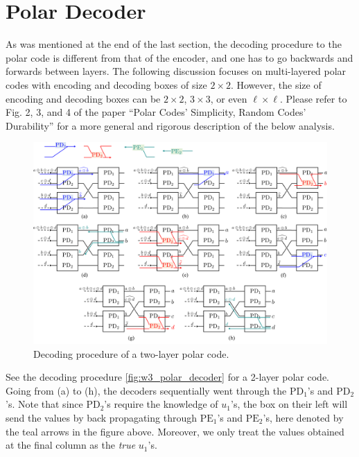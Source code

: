 \section{Polar Decoder}

As was mentioned at the end of the last section, the decoding procedure to the polar code is different from that of the encoder, and one has to go backwards and forwards between layers. The following discussion focuses on multi-layered polar codes with encoding and decoding boxes of size $2\times 2$. However, the size of encoding and decoding boxes can be $2\times2$, $3\times3$, or even $\ell\times\ell$. Please refer to Fig. 2, 3, and 4 of the paper  ``Polar Codes' Simplicity, Random Codes' Durability'' \cite{Polar_Code_Simplicity} for a more general and rigorous description of the below analysis.

\begin{figure}[h]
    \centering
    \includegraphics[width=1\linewidth]{figures/w3_2layer_decode.png}
    \caption{Decoding procedure of a two-layer polar code.}
    \label{fig:w3_polar_decoder}
\end{figure}

See the decoding procedure \autoref{fig:w3_polar_decoder} for a 2-layer polar code. Going from (a) to (h), the decoders sequentially went through the $\mathrm{PD}_1$'s and $\mathrm{PD}_2$'s. Note that since $\mathrm{PD}_2$'s require the knowledge of $u_1$'s, the box on their left will send the values by back propagating through $\mathrm{PE}_1$'s and $\mathrm{PE}_2$'s, here denoted by the teal arrows in the figure above. Moreover, we only treat the values obtained at the final column as the \textit{true} $u_1$'s.

